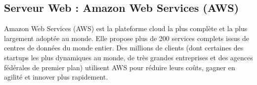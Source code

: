 \subsection{Serveur Web : Amazon Web Services (AWS)}

Amazon Web Services (AWS) est la plateforme cloud la plus complète et la plus largement adoptée au monde. Elle propose plus de 200 services complets issus de centres de données du monde entier. Des millions de clients (dont certaines des startups les plus dynamiques au monde, de très grandes entreprises et des agences fédérales de premier plan) utilisent AWS pour réduire leurs coûts, gagner en agilité et innover plus rapidement.

